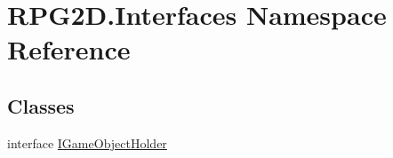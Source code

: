 \hypertarget{namespace_r_p_g2_d_1_1_interfaces}{}\section{R\+P\+G2\+D.\+Interfaces Namespace Reference}
\label{namespace_r_p_g2_d_1_1_interfaces}
\subsection*{Classes}
\begin{DoxyCompactItemize}
\item 
interface \mbox{\hyperlink{interface_r_p_g2_d_1_1_interfaces_1_1_i_game_object_holder}{I\+Game\+Object\+Holder}}
\end{DoxyCompactItemize}
